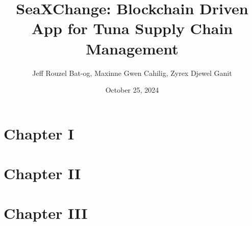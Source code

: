 \documentclass{Article}
\title{\textbf{SeaXChange: Blockchain Driven App for Tuna Supply Chain Management}}
\author{Jeff Rouzel Bat-og, Maxinne Gwen Cahilig, Zyrex Djewel Ganit}
\date{October 25, 2024}
\begin{document}
\maketitle
\section*{Chapter I}
\section*{Chapter II}
\section*{Chapter III}
\end{document}
